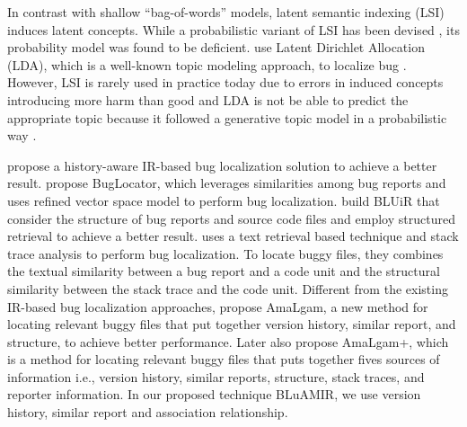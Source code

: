 \documentclass[conference]{IEEEtran}
\begin{document}
In contrast with shallow “bag-of-words” models, latent semantic indexing (LSI) induces latent concepts. While a probabilistic variant of LSI has been devised \cite{Hofmann}, its probability model was found to be deficient.
\citet{Lukins2} use Latent Dirichlet Allocation (LDA), which is a well-known topic modeling approach, to localize bug \cite{Lukins2}.
However, LSI is rarely used in practice today due to errors in induced concepts introducing more harm than good \cite{Hofmann} and LDA is not be able to predict the appropriate topic because it followed a generative topic model in a probabilistic way \cite{Lukins}.

\citet{Sisman} propose a history-aware IR-based bug localization solution to achieve a better
result. \citet{Jian} propose BugLocator, which leverages similarities among bug reports and uses refined vector space model to perform bug localization. \citet{Saha} build BLUiR that consider the structure of bug reports and source code files and employ structured retrieval to achieve a better result. \citet{Moreno} uses a text retrieval based technique and stack trace analysis to perform bug localization. To locate buggy files, they combines the textual similarity between a bug report and a code unit and the structural similarity between the stack trace and the code unit. Different from the existing IR-based bug localization approaches, \citet{Wang} propose AmaLgam, a new method for locating relevant buggy files that put together version history, similar report, and structure, to achieve better performance. Later \cite{Wang2} also propose AmaLgam+, which is a method for locating relevant buggy files that puts together fives sources of information i.e., version history, similar reports, structure, stack traces, and reporter information.
In our proposed technique BLuAMIR, we use version history, similar report and association relationship.
\end{document}
